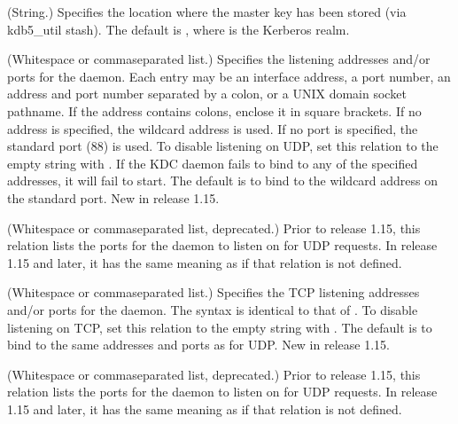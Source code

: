 \documentclass[letterpaper,10pt,english]{sphinxmanual}
\begin{document}
\begin{description}
\sphinxAtStartPar
(String.)  Specifies the location where the master key has been
stored (via kdb5\_util stash).  The default is {\hyperref[\detokenize{mitK5defaults:paths}]{}}, where  is the Kerberos realm.

\sphinxAtStartPar
(Whitespace\sphinxhyphen{} or comma\sphinxhyphen{}separated list.)  Specifies the listening
addresses and/or ports for the {\hyperref[\detokenize{admin/admin_commands/krb5kdc:krb5kdc-8}]{}} daemon.  Each
entry may be an interface address, a port number, an address and
port number separated by a colon, or a UNIX domain socket
pathname.  If the address contains colons, enclose it in square
brackets.  If no address is specified, the wildcard address is
used.  If no port is specified, the standard port (88) is used.
To disable listening on UDP, set this relation to the empty string
with .  If the KDC daemon fails to bind to any
of the specified addresses, it will fail to start.  The default is
to bind to the wildcard address on the standard port.  New in
release 1.15.

\sphinxAtStartPar
(Whitespace\sphinxhyphen{} or comma\sphinxhyphen{}separated list, deprecated.)  Prior to
release 1.15, this relation lists the ports for the
{\hyperref[\detokenize{admin/admin_commands/krb5kdc:krb5kdc-8}]{}} daemon to listen on for UDP requests.  In
release 1.15 and later, it has the same meaning as 
if that relation is not defined.

\sphinxAtStartPar
(Whitespace\sphinxhyphen{} or comma\sphinxhyphen{}separated list.)  Specifies the TCP
listening addresses and/or ports for the {\hyperref[\detokenize{admin/admin_commands/krb5kdc:krb5kdc-8}]{}} daemon.
The syntax is identical to that of .  To disable
listening on TCP, set this relation to the empty string with
.  The default is to bind to the same
addresses and ports as for UDP.  New in release 1.15.

\sphinxAtStartPar
(Whitespace\sphinxhyphen{} or comma\sphinxhyphen{}separated list, deprecated.)  Prior to
release 1.15, this relation lists the ports for the
{\hyperref[\detokenize{admin/admin_commands/krb5kdc:krb5kdc-8}]{}} daemon to listen on for UDP requests.  In
release 1.15 and later, it has the same meaning as
 if that relation is not defined.


\end{description}
\end{document}
